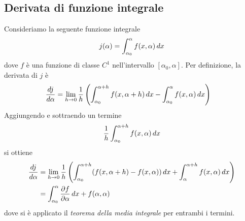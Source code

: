 \documentclass{article}
\begin{document}
\subsection*{Derivata di funzione integrale}
Consideriamo la seguente funzione integrale 
\begin{align}
    j(\alpha) = \int_{\alpha_0}^\alpha f(x, \alpha) \, dx \notag
\end{align}
dove $f$ è una funzione di classe $C^1$ nell'intervallo $[\alpha_0, \alpha]$. Per definizione, la derivata di $j$ è 
\begin{align}
    \frac{dj}{d\alpha} &= \lim_{h \rightarrow 0}\frac{1}{h}\left(\int_{\alpha_0}^{\alpha + h}f(x, \alpha + h) \, dx - \int_{\alpha_0}^\alpha f(x, \alpha) \, dx\right) \notag
\end{align}
Aggiungendo e sottraendo un termine
\begin{align}
    \frac{1}{h}\int_{\alpha_0}^{\alpha + h}f(x, \alpha) \, dx \notag
\end{align}
si ottiene 
\begin{align}
    \frac{dj}{d\alpha} &= \lim_{h \rightarrow 0}\frac{1}{h}\left(\int_{\alpha_0}^{\alpha + h}(f(x, \alpha + h) - f(x, \alpha)) \, dx + \int_{\alpha}^{\alpha + h}f(x, \alpha) \, dx\right) \notag \\
    &= \int_{\alpha_0}^\alpha \frac{\partial f}{\partial \alpha} \, dx + f(\alpha, \alpha) \notag
\end{align}
dove si è applicato il \textit{teorema della media integrale} per entrambi i termini. 
\end{document}
